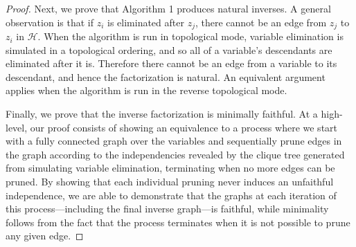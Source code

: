 \begin{proof}
Next, we prove that Algorithm 1 produces natural inverses. A general observation is that if $z_i$ is eliminated after $z_j$, there cannot be an edge from $z_j$ to $z_i$ in $\mathcal{H}$.
When the algorithm is run in topological mode, variable elimination is simulated in a topological ordering, and so all of a variable's descendants are eliminated after it is.
Therefore there cannot be an edge from a variable to its descendant, and hence the factorization is natural. An equivalent argument applies when the algorithm is run in the reverse topological mode.

Finally, we prove that the inverse factorization is minimally faithful. At a high-level, our proof consists of
showing an equivalence to a process where we
start with a fully connected graph over the variables and sequentially prune edges in the graph according to
the independencies revealed by the clique tree generated from simulating variable elimination, 
terminating when no more edges can be pruned.  
By showing that
each individual pruning never induces an unfaithful independence, we are able to demonstrate that the graphs at
each iteration of this process---including the final inverse graph---is faithful, while minimality follows from 
the fact that the process terminates when it is not possible to prune any given edge.


\end{proof}
